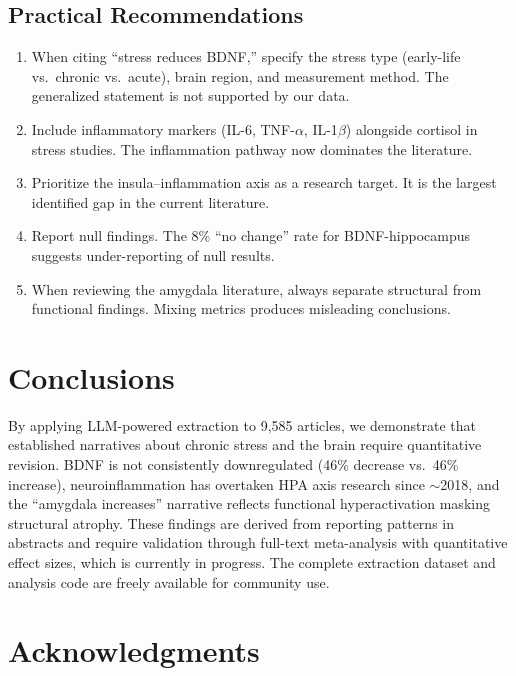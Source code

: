 \documentclass[12pt,a4paper]{article}
\begin{document}
\subsection{Practical Recommendations}

\begin{enumerate}
    \item When citing ``stress reduces BDNF,'' specify the stress type (early-life vs.\ chronic vs.\ acute), brain region, and measurement method. The generalized statement is not supported by our data.
    \item Include inflammatory markers (IL-6, TNF-$\alpha$, IL-1$\beta$) alongside cortisol in stress studies. The inflammation pathway now dominates the literature.
    \item Prioritize the insula--inflammation axis as a research target. It is the largest identified gap in the current literature.
    \item Report null findings. The 8\% ``no change'' rate for BDNF-hippocampus suggests under-reporting of null results.
    \item When reviewing the amygdala literature, always separate structural from functional findings. Mixing metrics produces misleading conclusions.
\end{enumerate}

\section{Conclusions}

By applying LLM-powered extraction to 9,585 articles, we demonstrate that established narratives about chronic stress and the brain require quantitative revision. BDNF is not consistently downregulated (46\% decrease vs.\ 46\% increase), neuroinflammation has overtaken HPA axis research since $\sim$2018, and the ``amygdala increases'' narrative reflects functional hyperactivation masking structural atrophy. These findings are derived from reporting patterns in abstracts and require validation through full-text meta-analysis with quantitative effect sizes, which is currently in progress. The complete extraction dataset and analysis code are freely available for community use.

\section*{Acknowledgments}
\end{document}
